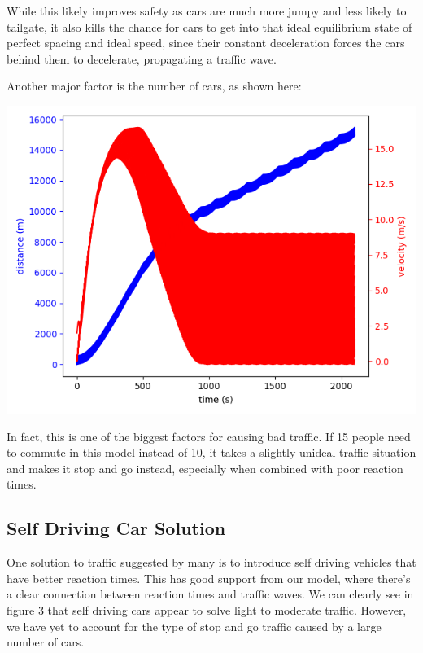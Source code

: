 \documentclass[11pt]{article}
\begin{document}
\begin{multicols}{2}
		\indent While this likely improves safety as cars are much more jumpy and less likely to tailgate, it also kills the chance for cars to get into that ideal equilibrium state of perfect spacing and ideal speed, since
		their constant deceleration forces the cars behind them to decelerate, propagating a traffic wave.

		\indent Another major factor is the number of cars, as shown here:

		\includegraphics[scale = 0.5]{Figure_5.png}

		\indent In fact, this is one of the biggest factors for causing bad traffic. If 15 people need to commute in this model instead of 10, it takes a slightly unideal traffic situation and makes it stop and go instead, especially when combined with poor reaction times.

		\subsection*{Self Driving Car Solution}

			\indent One solution to traffic suggested by many is to introduce self driving vehicles that have better reaction times. This has good support from our model, where there's a clear connection between reaction times and
			traffic waves. We can clearly see in figure 3 that self driving cars appear to solve light to moderate traffic. However, we have yet to account for the type of stop and go traffic caused by a large number of cars.


\end{multicols}
\end{document}
